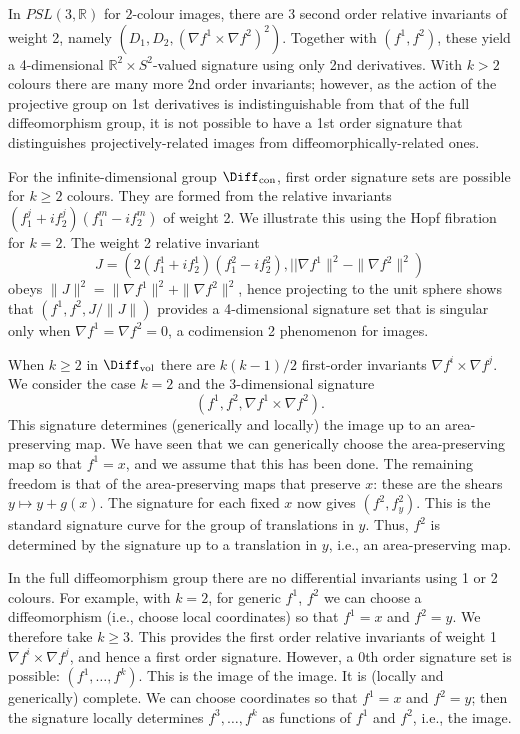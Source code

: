 \documentclass[review,onefignum,onetabnum]{siamonline190516}
\begin{document}
In $PSL(3, \mathbb{R})$ for $2$-colour images, there are 3 second order relative invariants of weight 2, namely $(D_1,D_2,(\nabla f^1\times \nabla f^2)^2)$. Together with $(f^1,f^2)$, these yield a 4-dimensional $\mathbb{R}^2\times S^2$-valued signature using only 2nd derivatives. With $k>2$ colours there are many more 2nd order invariants; however, as the action of the projective group on 1st derivatives is indistinguishable from that of the full diffeomorphism group, it is not possible to have a 1st order signature that distinguishes projectively-related images from diffeomorphically-related ones.

For the infinite-dimensional group $\Diff_{\mathrm{con}}$, first order signature sets are possible for $k \ge 2$ colours. They are formed from the relative invariants $(f^j_1 + i f^j_2)(f^m_1 - i f^m_2)$ of weight 2. We illustrate this using the Hopf fibration for $k=2$. The weight 2 relative invariant $$J = (2(f^1_1 + i f^1_2)(f^2_1 - i f^2_2), ||\nabla f^1\|^2 - \|\nabla f^2\|^2)$$ obeys $\|J\|^2 = \|\nabla f^1\|^2 + \|\nabla f^2\|^2$, hence projecting to the unit sphere shows that $(f^1,f^2,J/\|J\|)$ provides a 4-dimensional signature set that is singular only when $\nabla f^1 = \nabla f^2 = 0$, a codimension 2 phenomenon for images.

When $k\ge 2$ in $\Diff_{\mathrm{vol}}$ there are $k(k-1)/2$ first-order invariants $ \nabla f^i \times \nabla f^j$.  We consider the case $k=2$ and the 3-dimensional signature $$ (f^1,f^2, \nabla f^1 \times \nabla f^2).$$ This signature determines (generically and locally) the image up to an area-preserving map.  We have seen that we can generically choose the area-preserving map so that $f^1=x$, and we assume that this has been done. The remaining freedom is that of the area-preserving maps that preserve $x$: these are the shears $y\mapsto y + g(x)$. The signature for each fixed $x$ now gives $(f^2,f^2_y)$. This is the standard signature curve for the group of translations in $y$. Thus, $f^2$ is determined by the signature up to a translation in $y$, i.e., an area-preserving map.

In the full diffeomorphism group there are no differential invariants using 1 or 2 colours. For example, with $k=2$, for generic $f^1$, $f^2$ we can choose a diffeomorphism (i.e., choose local coordinates) so that $f^1=x$ and $f^2=y$. We therefore take $k\ge 3$. This provides the first order relative invariants of weight 1 $\nabla f^i\times \nabla f^j$, and hence a first order signature. However, a 0th order signature set is possible: $(f^1,\dots,f^k)$. This is the image of the image. It is (locally and generically) complete. We can choose coordinates so that $f^1=x$ and $f^2=y$; then the signature locally determines $f^3,\dots,f^k$ as functions of $f^1$ and $f^2$, i.e., the image.
\end{document}
